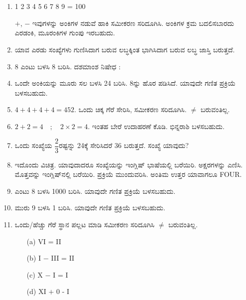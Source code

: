 \chapter[ಅಧ್ಯಾಯ 8]{}\label{chap8}

\begin{enumerate}
\renewcommand{\labelenumi}{\bf\theenumi.}
\itemsep=5pt

\item 1 2 3 4 5 6 7 8 9 = 100

$+$, $-$ ಇವುಗಳನ್ನು ಅಂಕಿಗಳ ನಡುವೆ ಹಾಕಿ ಸಮೀಕರಣ ಸರಿದೂಗಿಸಿ. ಅಂಕಿಗಳ ಕ್ರಮ ಬದಲಿಸಬಾರದು ಎರಡಂಕಿ, ಮೂರಂಕಿಗಳ ಗುಂಪು ಇರಬಹುದು. 

\item ಯಾವ ಎರಡು ಸಂಖ್ಯೆಗಳು ಗುಣಿಸಿದಾಗ ಬರುವ ಲಬ್ಧಕ್ಕಿಂತ ಭಾಗಿಸಿದಾಗ ಬರುವ ಲಬ್ಧ ಜಾಸ್ತಿ ಬರುತ್ತದೆ. 

\item 8 ಎಂಟು ಬಳಸಿ 8 ಬರಿಸಿ. ದಶಮಾಂಶ ನಿಷೇಧ :

\item ಒಂದೇ ಅಂಕಿಯನ್ನು ಮೂರು ಸಲ ಬಳಸಿ 24 ಬರಿಸಿ. 8ನ್ನು ಹೊರ ಪಡಿಸಿದೆ. ಯಾವುದೇ ಗಣಿತ ಪ್ರಕ್ರಿಯೆ ಬಳಸಬಹುದು. 

\item $4 + 4 + 4 + 4 = 452$. ಒಂದು ಚಿಕ್ಕ ಗೆರೆ ಸೇರಿಸಿ, ಸಮೀಕರಣ ಸರಿದೂಗಿಸಿ. $\neq$ ಬರುವಂತಿಲ್ಲ. 

\item $2 + 2 = 4\quad;\quad 2\times 2 = 4$. ಇಂತಹ ಬೇರೆ ಉದಾಹರಣೆ ಕೊಡಿ. ಭಿನ್ನರಾಶಿ ಬಳಸಬಹುದು. 

\item ಒಂದು ಸಂಖ್ಯೆಯ $\dfrac{2}{3}$ರಷ್ಟನ್ನು 24ಕ್ಕೆ ಸೇರಿಸಿದರೆ 36 ಬರುತ್ತದೆ. ಸಂಖ್ಯೆ ಯಾವುದು? 

\item ಇದೊಂದು ವಿಚಿತ್ರ. ಯಾವುದಾದರೂ ಸಂಖ್ಯೆಯನ್ನು ಇಂಗ್ಲಿಷ್ ಭಾಷೆಯಲ್ಲಿ ಬರೆಯಿರಿ. ಅಕ್ಷರಗಳನ್ನು ಎಣಿಸಿ. ಮೊತ್ತವನ್ನು ಇಂಗ್ಲಿಷ್‌ನಲ್ಲಿ ಬರೆಯಿರಿ. ಪ್ರಕ್ರಿಯೆ ಮುಂದುವರಿಸಿ. ಅಂತಿಮ ಉತ್ತರ ಯಾವಾಗಲೂ FOUR.

\item ಎಂಟು 8 ಬಳಸಿ 1000 ಬರಿಸಿ. ಯಾವುದೇ ಗಣಿತ ಪ್ರಕ್ರಿಯೆ ಬಳಸಬಹುದು. 

\item ಮುರು 9 ಬಳಸಿ 1  ಬರಿಸಿ. ಯಾವುದೇ ಗಣಿತ ಪ್ರಕ್ರಿಯೆ ಬಳಸಬಹುದು. 

\item ಒಂದು/ಹೆಚ್ಚು ಗೆರೆ ಸ್ಥಾನ ಪಲ್ಲಟ ಮಾಡಿ ಸಮೀಕರಣ ಸರಿದೂಗಿಸಿ $\neq$ ಬರುವಂತಿಲ್ಲ. 
\begin{itemize}
\item[(a)] VI = II
\item[(b)] I $-$ III = II
\item[(c)] X $-$ I = I
\item[(d)] XI $+$ 0 - I
\end{itemize}


\end{enumerate}
